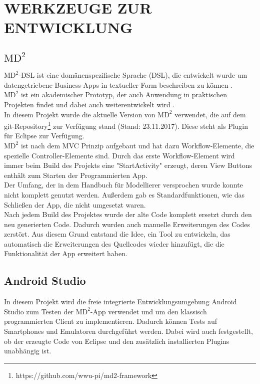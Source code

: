 \section{\uppercase{Werkzeuge zur Entwicklung}}
	
	\subsection{$\text{MD}^2$}
	$\text{MD}^2$-DSL ist eine dom\"anenspezifische Sprache (DSL), die entwickelt wurde um datengetriebene Business-Apps in textueller Form beschreiben zu k\"onnen \cite{DSLMD2_2013}.\\
	$\text{MD}^2$ ist ein akademischer Prototyp, der auch Anwendung in praktischen Projekten findet und dabei auch weiterentwickelt wird \cite{MDCP2015}.\\
	In diesem Projekt wurde die aktuelle Version von $\text{MD}^2$ verwendet, die auf dem git-Repository\footnote{https://github.com/wwu-pi/md2-framework} zur Verf\"ugung stand (Stand: 23.11.2017). Diese steht als Plugin f\"ur Eclipse zur Verf\"ugung.\\
	$\text{MD}^2$ ist nach dem MVC Prinzip aufgebaut und hat dazu Workflow-Elemente, die spezielle Controller-Elemente sind\cite{Handbookmd2}. Durch das erste Workflow-Element wird immer beim Build des Projekts eine "StartActivity" erzeugt, deren View Buttons enth\"alt zum Starten der Programmierten App.\\
	Der Umfang, der in dem Handbuch f\"ur Modellierer versprochen wurde konnte nicht komplett genutzt werden. Au\ss{}erdem gab es Standardfunktionen, wie das Schlie\ss{}en der App, die nicht umgesetzt waren.\\
	Nach jedem Build des Projektes wurde der alte Code komplett ersetzt durch den neu generierten Code. Dadurch wurden auch manuelle Erweiterungen des Codes zerst\"ort. Aus diesem Grund entstand die Idee, ein Tool zu entwickeln, das automatisch die Erweiterungen des Quellcodes wieder hinzuf\"ugt, die die Funktionalit\"at der App erweitert haben.
	
	\subsection{Android Studio}
	In diesem Projekt wird die freie integrierte Entwicklungsumgebung Android Studio zum Testen der $\text{MD}^2$-App verwendet und um den klassisch programmierten Client zu implementieren. Dadurch k\"onnen Tests auf Smartphones und Emulatoren durchgef\"uhrt werden. Dabei wird auch festgestellt, ob der erzeugte Code von Eclipse und den zus\"atzlich installierten Plugins unabh\"angig ist.

